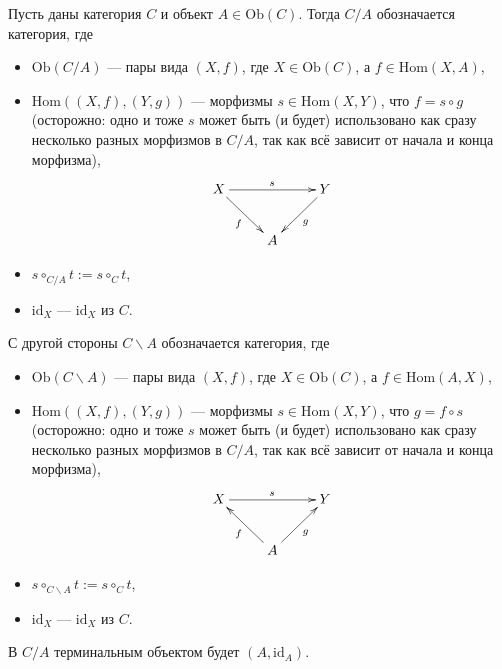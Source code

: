 \documentclass[12pt,a4paper]{article}
\newcommand{\Hom}{\mathrm{Hom}}
\newcommand{\Ob}{\mathrm{Ob}}
\newcommand{\id}{\mathrm{id}}
\begin{document}
    \begin{definition}
        Пусть даны категория $C$ и объект $A \in \Ob(C)$. Тогда $C/A$ обозначается категория, где
        \begin{itemize}
            \item $\Ob(C/A)$ --- пары вида $(X, f)$, где $X \in \Ob(C)$, а $f \in \Hom(X, A)$,
            \item $\Hom((X, f), (Y, g))$ --- морфизмы $s \in \Hom(X, Y)$, что $f = s \circ g$ (осторожно: одно и тоже $s$ может быть (и будет) использовано как сразу несколько разных морфизмов в $C/A$, так как всё зависит от начала и конца морфизма),
                \[
                    \xymatrix{
                        X \ar[rd]_{f} \ar[rr]^{s} && Y \ar[ld]^{g}\\
                        & A
                    }
                \]
            \item $s \circ_{C/A} t := s \circ_C t$,
            \item $\id_{X}$ --- $\id_X$ из $C$.
        \end{itemize}
        С другой стороны $C\backslash A$ обозначается категория, где
        \begin{itemize}
            \item $\Ob(C\backslash A)$ --- пары вида $(X, f)$, где $X \in \Ob(C)$, а $f \in \Hom(A, X)$,
            \item $\Hom((X, f), (Y, g))$ --- морфизмы $s \in \Hom(X, Y)$, что $g = f \circ s$ (осторожно: одно и тоже $s$ может быть (и будет) использовано как сразу несколько разных морфизмов в $C/A$, так как всё зависит от начала и конца морфизма),
                \[
                    \xymatrix{
                        X \ar[rr]^{s} && Y\\
                        & A \ar[lu]^{f} \ar[ru]_{g}
                    }
                \]
            \item $s \circ_{C\backslash A} t := s \circ_C t$,
            \item $\id_{X}$ --- $\id_X$ из $C$.
        \end{itemize}
    \end{definition}

    \begin{example}
        В $C/A$ терминальным объектом будет $(A, \id_A)$.
    \end{example}
\end{document}
